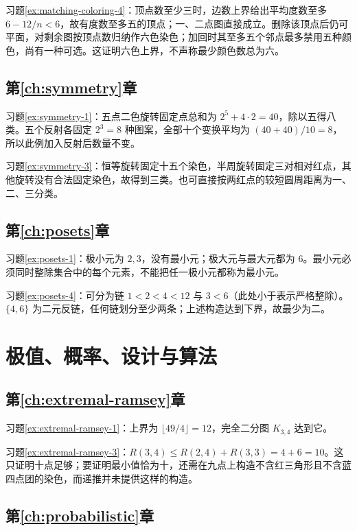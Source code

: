 习题\ref{ex:matching-coloring-4}：顶点数至少三时，边数上界给出平均度数至多 $6-12/n<6$，故有度数至多五的顶点；一、二点图直接成立。删除该顶点后仍可平面，对剩余图按顶点数归纳作六色染色；加回时其至多五个邻点最多禁用五种颜色，尚有一种可选。这证明六色上界，不声称最少颜色数总为六。

\subsection{第\ref{ch:symmetry}章}

习题\ref{ex:symmetry-1}：五点二色旋转固定点总和为 $2^5+4\cdot2=40$，除以五得八类。五个反射各固定 $2^3=8$ 种图案，全部十个变换平均为 $(40+40)/10=8$，所以此例加入反射后数量不变。

习题\ref{ex:symmetry-3}：恒等旋转固定十五个染色，半周旋转固定三对相对红点，其他旋转没有合法固定染色，故得到三类。也可直接按两红点的较短圆周距离为一、二、三分类。

\subsection{第\ref{ch:posets}章}

习题\ref{ex:posets-1}：极小元为 $2,3$，没有最小元；极大元与最大元都为 $6$。最小元必须同时整除集合中的每个元素，不能把任一极小元都称为最小元。

习题\ref{ex:posets-4}：可分为链 $1<2<4<12$ 与 $3<6$（此处小于表示严格整除）。$\{4,6\}$ 为二元反链，任何链划分至少两条；上述构造达到下界，故最少为二。

\section{极值、概率、设计与算法}

\subsection{第\ref{ch:extremal-ramsey}章}

习题\ref{ex:extremal-ramsey-1}：上界为 $\lfloor49/4\rfloor=12$，完全二分图 $K_{3,4}$ 达到它。

习题\ref{ex:extremal-ramsey-3}：$R(3,4)\le R(2,4)+R(3,3)=4+6=10$。这只证明十点足够；要证明最小值恰为十，还需在九点上构造不含红三角形且不含蓝四点团的染色，而递推并未提供这样的构造。

\subsection{第\ref{ch:probabilistic}章}

